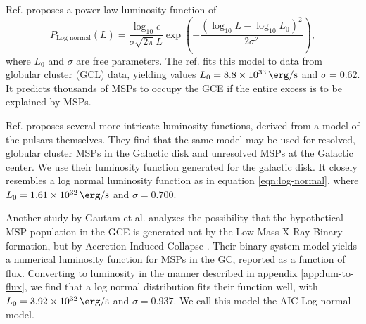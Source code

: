 \documentclass[a4paper,11pt]{article}
\newcommand{\parens}[1]{\left(#1\right)}
\newcommand{\expp}[1]{\exp \parens{#1}}
\newcommand{\comment}[1]{\emph{\color{red}{#1}}}
\begin{document}
Ref. \cite{osti_1305131} proposes a power law luminosity function of
\begin{equation}
    P_\text{Log normal}(L)= \frac{\log_{10} e}{\sigma \sqrt{2\pi} L}\expp{-\frac{\parens{\log_{10} L - \log_{10} L_0}^2}{2\sigma^2}},
    \label{eqn:log-normal}
\end{equation}
where $L_0$ and $\sigma$ are free parameters. The ref. fits this model to data from globular cluster (GCL) data, yielding values $L_0 = \SI{8.8e33}{\erg\per\second}$ and $\sigma=0.62$. It predicts thousands of MSPs to occupy the GCE if the entire excess is to be explained by MSPs.

Ref. \cite{Ploeg:2020jeh} proposes several more intricate luminosity functions, derived from a model of the pulsars themselves. They find that the same model may be used for resolved, globular cluster MSPs in the Galactic disk and unresolved MSPs at the Galactic center. We use their luminosity function generated for the galactic disk. It closely resembles a log normal luminosity function as in equation \ref{eqn:log-normal}, where $L_0 = \SI{1.61e+32}{\erg\per\second}$ and $\sigma=0.700$.

Another study by Gautam et al. analyzes the possibility that the hypothetical MSP population in the GCE is generated not by the Low Mass X-Ray Binary formation, but by Accretion Induced Collapse \cite{Gautam:2021wqn}. \comment{To distinguish between this, a definition of these two collapse methods, along with models other than an MSP model, should be put in the introduction. Mention the fact that the MSPs in the GCE would have to look different from that in the disk.} Their binary system model yields a numerical luminosity function for MSPs in the GC, reported as a function of flux. Converting to luminosity in the manner described in appendix \ref{app:lum-to-flux}, we find that a log normal distribution fits their function well, with $L_0 = \SI{3.92e+32}{\erg\per\second}$ and $\sigma = 0.937$. We call this model the AIC Log normal model.
\end{document}
